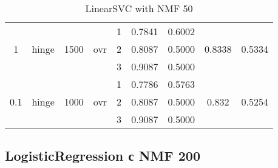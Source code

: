 \documentclass[12pt, twoside]{article}
\begin{document}
\begin{landscape}
\begin{table}[!htbp]
\begin{tabular}{ccccccccc}
  	&	&	&	&	1	&	0.7841	&	0.6002	&		&	 \\
  1	&	hinge	&	1500	&	ovr	&	2	&	0.8087	&	0.5000	&	0.8338	&	0.5334 \\
  	&	&	&	&	3	&	0.9087	&	0.5000	&		&	 \\
  	\cmidrule(r){5-9}
  	&	&	&	&	1	&	0.7786	&	0.5763	&		&	 \\
  0.1	&	hinge	&	1000	&	ovr	&	2	&	0.8087	&	0.5000	&	0.832	&	0.5254 \\
  	&	&	&	&	3	&	0.9087	&	0.5000	&		&	 \\
  \bottomrule
  \end{tabular}
  \caption{LinearSVC with NMF 50}
\end{table}
\end{landscape}

\subsection{LogisticRegression с NMF 200}
\end{document}
